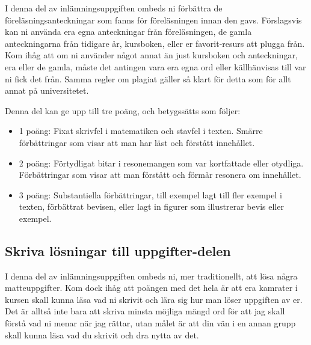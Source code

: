 \documentclass{tufte-handout}
\begin{document}
I denna del av inlämningsuppgiften ombeds ni förbättra de föreläsningsanteckningar som fanns för föreläsningen innan den gavs. Förslagsvis kan ni använda era egna anteckningar från föreläsningen, de gamla anteckningarna från tidigare år, kursboken, eller er favorit-resurs att plugga från. Kom ihåg att om ni använder något annat än just kursboken och anteckningar, era eller de gamla, måste det antingen vara era egna ord eller källhänvisas till var ni fick det från. Samma regler om plagiat gäller så klart för detta som för allt annat på universitetet.

Denna del kan ge upp till tre poäng, och betygssätts som följer:
\begin{itemize}
	\item 1 poäng: Fixat skrivfel i matematiken och stavfel i texten. Smärre förbättringar som visar att man har läst och förstått innehållet.
	\item 2 poäng: Förtydligat bitar i resonemangen som var kortfattade eller otydliga. Förbättringar som visar att man förstått och förmår resonera om innehållet.
	\item 3 poäng: Substantiella förbättringar, till exempel lagt till fler exempel i texten, förbättrat bevisen, eller lagt in figurer som illustrerar bevis eller exempel.
\end{itemize}

\subsection{Skriva lösningar till uppgifter-delen}

I denna del av inlämningsuppgiften ombeds ni, mer traditionellt, att lösa några matteuppgifter. Kom dock ihåg att poängen med det hela är att era kamrater i kursen skall kunna läsa vad ni skrivit och lära sig hur man löser uppgiften av er. Det är alltså inte bara att skriva minsta möjliga mängd ord för att jag skall förstå vad ni menar när jag rättar, utan målet är att din vän i en annan grupp skall kunna läsa vad du skrivit och dra nytta av det.
\end{document}
